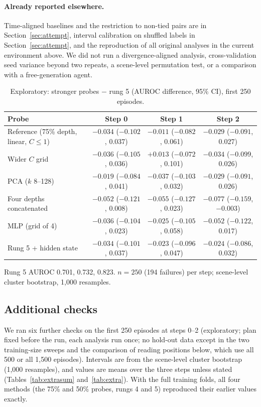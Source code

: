 \documentclass[11pt]{article}
\begin{document}
\paragraph{Already reported elsewhere.} Time-aligned baselines and the restriction to non-tied pairs are in Section~\ref{sec:attempt}, interval calibration on shuffled labels in Section~\ref{sec:attempt}, and the reproduction of all original analyses in the current environment above.
We did not run a divergence-aligned analysis, cross-validation seed variance beyond two repeats, a scene-level permutation test, or a comparison with a free-generation agent.

\begin{table}[t]
\centering\small
\caption{Exploratory: stronger probes $-$ rung 5 (AUROC difference, 95\% CI), first 250 episodes.}\label{tab:strength}
\begin{tabularx}{\linewidth}{@{}Lccc@{}}
\toprule
Probe & Step 0 & Step 1 & Step 2 \\
\midrule
Reference (75\% depth, linear, $C \le 1$) & $-0.034$ ($-0.102$, 0.037) & $-0.011$ ($-0.082$, 0.061) & $-0.029$ ($-0.091$, 0.027) \\
Wider $C$ grid & $-0.036$ ($-0.105$, 0.036) & $+0.013$ ($-0.072$, 0.101) & $-0.034$ ($-0.099$, 0.026) \\
PCA ($k$ 8--128) & $-0.019$ ($-0.084$, 0.041) & $-0.037$ ($-0.103$, 0.032) & $-0.029$ ($-0.091$, 0.026) \\
Four depths concatenated & $-0.052$ ($-0.121$, 0.008) & $-0.055$ ($-0.127$, 0.023) & $-0.077$ ($-0.159$, $-0.003$) \\
MLP (grid of 4) & $-0.036$ ($-0.104$, 0.023) & $-0.025$ ($-0.105$, 0.058) & $-0.052$ ($-0.122$, 0.017) \\
Rung 5 + hidden state & $-0.034$ ($-0.101$, 0.037) & $-0.023$ ($-0.096$, 0.047) & $-0.024$ ($-0.086$, 0.032) \\
\bottomrule
\end{tabularx}
\par\smallskip\raggedright\footnotesize
Rung 5 AUROC 0.701, 0.732, 0.823. $n = 250$ (194 failures) per step; scene-level cluster bootstrap, 1,000 resamples.
\end{table}

\subsection{Additional checks}\label{sec:extra}
We ran six further checks on the first 250 episodes at steps 0--2 (exploratory; plan fixed before the run, each analysis run once; no hold-out data except in the two training-size sweeps and the comparison of reading positions below, which use all 500 or all 1,500 episodes). Intervals are from the scene-level cluster bootstrap (1,000 resamples), and values are means over the three steps unless stated (Tables~\ref{tab:extrasum} and~\ref{tab:extra}). With the full training folds, all four methods (the 75\% and 50\% probes, rungs 4 and 5) reproduced their earlier values exactly.
\end{document}
